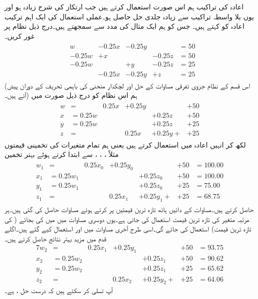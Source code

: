 اعادہ کی تراکیب ہم اس صورت استعمال کرتے ہیں جب ارتکاز کی شرح زیادہ ہو اور یوں بلا واسطہ تراکیب سے زیادہ جلدی حل حاصل ہو۔عملی استعمال کی ایک اہم ترکیب اعادہ کو  کہتے ہیں۔  جس کو ہم ایک مثال کی مدد سے سمجھتے ہیں۔درج ذیل نظام پر غور کریں۔
\begin{gather}
\begin{alignedat} {5}\label{مساوات_خطی_اعدادی_مثال_الف}
&w&-0.25x&-0.25y&{}&=50\\
&-0.25w&+x&{}&-0.25z&=50\\
&-0.25w&{}&+y&-0.25z&=25\\
&{}&-0.25x&-0.25y&+z&=25
\end{alignedat}
\end{gather}
(اس قسم کے نظام جزوی تفرقی مساوات کے حل اور لچکدار منحنی کی  باہمی تحریف کے دوران پیش آتے ہیں۔) ہم اس نظام کو درج ذیل صورت میں 
\begin{gather}
\begin{alignedat}{6}\label{مساوات_خطی_اعدادی_مثال_ب}
w&={}&0.25x&+0.25y&{}&+50\\
x&=0.25w&{}&{}&+0.25z&+50\\
y&=0.25w&{}&{}&+0.25z&+25\\
z&=&{}&0.25x&+0.25y+{}&+25
\end{alignedat}
\end{gather}
لکھ کر انہیں اعادہ میں استعمال کرتے ہیں یعنی ہم تمام متغیرات کی تخمینی قیمتوں مثلاً ، ، ،  سے ابتدا کرتے ہوئے بہتر تخمین 
\begin{gather}
\begin{alignedat}{7}\label{مساوات_خطی_اعدادی_مثال_پ}
w_1&={}&0.25x_0&+0.25y_0&{}&+50&=100.00\\
x_1&=0.25w_1&{}&{}&+0.25z_0&+50&=100.00\\
y_1&=0.25w_1&{}&{}&+0.25z_0&+25&=75.00\\
z_1&=&{}&{}0.25x_1&+0.25y_1+{}&+25&=68.75
\end{alignedat}
\end{gather}
حاصل کرتے ہیں۔مساوات  کے دائیں ہاتھ تازہ ترین قیمتیں پر کرتے ہوئے مساوات  حاصل کی گئی ہیں۔ہر مرتبہ متغیر کی تازہ ترین قیمت استعمال کی جاتی ہے۔یوں دوسری مساوات میں  میں  کی بجائے ( کی تازہ ترین قیمت)  استعمال کی جائے گی۔اسی طرح آخری مساوات میں  اور  استعمال کیے گئے ہیں۔اگلے قدم میں مزید بہتر نتائج حاصل کرتے ہیں۔
\begin{alignat*}{7}
w_2&={}&0.25x_1&+0.25y_1&{}&+50&=93.75\\
x_2&=0.25w_2&{}&{}&+0.25z_1&+50&=90.62\\
y_2&=0.25w_2&{}&{}&+0.25z_1&+25&=65.62\\
z_2&=&{}&{}0.25x_2&+0.25y_2+{}&+25&=64.06
\end{alignat*}
آپ تسلی کر سکتے ہیں کہ درست حل ،  ہے۔

